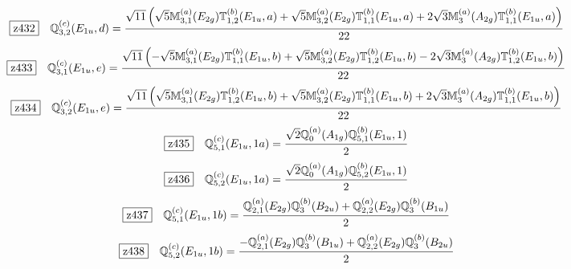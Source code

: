 \documentclass[fleqn,10pt,landscape]{jsarticle}
\begin{document}
\begin{dmath*}
\hspace*{3mm}\fbox{z432}\quad \mathbb{Q}_{3,2}^{(c)}(E_{1u},d)=\frac{\sqrt{11} \left(\sqrt{5} \mathbb{M}_{3,1}^{(a)}(E_{2g}) \mathbb{T}_{1,2}^{(b)}(E_{1u},a) + \sqrt{5} \mathbb{M}_{3,2}^{(a)}(E_{2g}) \mathbb{T}_{1,1}^{(b)}(E_{1u},a) + 2 \sqrt{3} \mathbb{M}_{3}^{(a)}(A_{2g}) \mathbb{T}_{1,1}^{(b)}(E_{1u},a)\right)}{22}
\end{dmath*}
\begin{dmath*}
\hspace*{3mm}\fbox{z433}\quad \mathbb{Q}_{3,1}^{(c)}(E_{1u},e)=\frac{\sqrt{11} \left(- \sqrt{5} \mathbb{M}_{3,1}^{(a)}(E_{2g}) \mathbb{T}_{1,1}^{(b)}(E_{1u},b) + \sqrt{5} \mathbb{M}_{3,2}^{(a)}(E_{2g}) \mathbb{T}_{1,2}^{(b)}(E_{1u},b) - 2 \sqrt{3} \mathbb{M}_{3}^{(a)}(A_{2g}) \mathbb{T}_{1,2}^{(b)}(E_{1u},b)\right)}{22}
\end{dmath*}
\begin{dmath*}
\hspace*{3mm}\fbox{z434}\quad \mathbb{Q}_{3,2}^{(c)}(E_{1u},e)=\frac{\sqrt{11} \left(\sqrt{5} \mathbb{M}_{3,1}^{(a)}(E_{2g}) \mathbb{T}_{1,2}^{(b)}(E_{1u},b) + \sqrt{5} \mathbb{M}_{3,2}^{(a)}(E_{2g}) \mathbb{T}_{1,1}^{(b)}(E_{1u},b) + 2 \sqrt{3} \mathbb{M}_{3}^{(a)}(A_{2g}) \mathbb{T}_{1,1}^{(b)}(E_{1u},b)\right)}{22}
\end{dmath*}
\begin{dmath*}
\hspace*{3mm}\fbox{z435}\quad \mathbb{Q}_{5,1}^{(c)}(E_{1u},1a)=\frac{\sqrt{2} \mathbb{Q}_{0}^{(a)}(A_{1g}) \mathbb{Q}_{5,1}^{(b)}(E_{1u},1)}{2}
\end{dmath*}
\begin{dmath*}
\hspace*{3mm}\fbox{z436}\quad \mathbb{Q}_{5,2}^{(c)}(E_{1u},1a)=\frac{\sqrt{2} \mathbb{Q}_{0}^{(a)}(A_{1g}) \mathbb{Q}_{5,2}^{(b)}(E_{1u},1)}{2}
\end{dmath*}
\begin{dmath*}
\hspace*{3mm}\fbox{z437}\quad \mathbb{Q}_{5,1}^{(c)}(E_{1u},1b)=\frac{\mathbb{Q}_{2,1}^{(a)}(E_{2g}) \mathbb{Q}_{3}^{(b)}(B_{2u}) + \mathbb{Q}_{2,2}^{(a)}(E_{2g}) \mathbb{Q}_{3}^{(b)}(B_{1u})}{2}
\end{dmath*}
\begin{dmath*}
\hspace*{3mm}\fbox{z438}\quad \mathbb{Q}_{5,2}^{(c)}(E_{1u},1b)=\frac{- \mathbb{Q}_{2,1}^{(a)}(E_{2g}) \mathbb{Q}_{3}^{(b)}(B_{1u}) + \mathbb{Q}_{2,2}^{(a)}(E_{2g}) \mathbb{Q}_{3}^{(b)}(B_{2u})}{2}
\end{dmath*}
\end{document}
